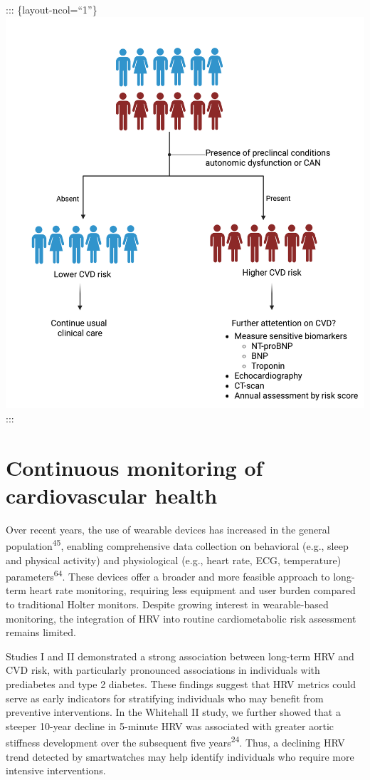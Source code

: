 \documentclass[
  a4paper,
  headsepline=true,
  open=any]{scrbook}
\begin{document}
::: \{layout-ncol=``1''\}
\includegraphics{images/strafication_tree_of_CAN.png} :::

\hypertarget{continuous-monitoring-of-cardiovascular-health}{%
\section{Continuous monitoring of cardiovascular
health}\label{continuous-monitoring-of-cardiovascular-health}}

Over recent years, the use of wearable devices has increased in the
general population\textsuperscript{45}, enabling comprehensive data
collection on behavioral (e.g., sleep and physical activity) and
physiological (e.g., heart rate, ECG, temperature)
parameters\textsuperscript{64}. These devices offer a broader and more
feasible approach to long-term heart rate monitoring, requiring less
equipment and user burden compared to traditional Holter monitors.
Despite growing interest in wearable-based monitoring, the integration
of HRV into routine cardiometabolic risk assessment remains limited.

Studies I and II demonstrated a strong association between long-term HRV
and CVD risk, with particularly pronounced associations in individuals
with prediabetes and type 2 diabetes. These findings suggest that HRV
metrics could serve as early indicators for stratifying individuals who
may benefit from preventive interventions. In the Whitehall II study, we
further showed that a steeper 10-year decline in 5-minute HRV was
associated with greater aortic stiffness development over the subsequent
five years\textsuperscript{24}. Thus, a declining HRV trend detected by
smartwatches may help identify individuals who require more intensive
interventions.
\end{document}

